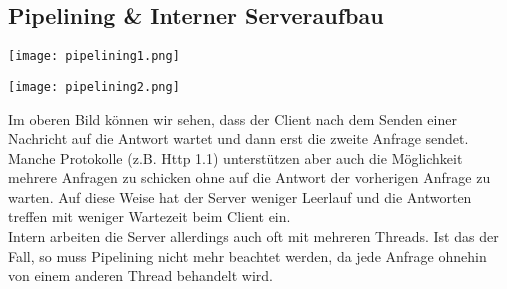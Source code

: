 \subsection{Pipelining \& Interner Serveraufbau}

\texttt{[image: pipelining1.png]}

\texttt{[image: pipelining2.png]}

Im oberen Bild können wir sehen, dass der Client nach dem Senden einer Nachricht auf die Antwort wartet und dann erst die zweite Anfrage sendet. Manche Protokolle (z.B. Http 1.1) unterstützen aber auch die Möglichkeit mehrere Anfragen zu schicken ohne auf die Antwort der vorherigen Anfrage zu warten. Auf diese Weise hat der Server weniger Leerlauf und die Antworten treffen mit weniger Wartezeit beim Client ein.\\

Intern arbeiten die Server allerdings auch oft mit mehreren Threads. Ist das der Fall, so muss Pipelining nicht mehr beachtet werden, da jede Anfrage ohnehin von einem anderen Thread behandelt wird.